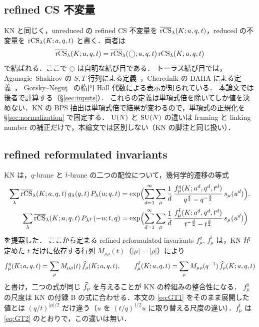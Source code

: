 \subsection{refined CS 不変量}
KN と同じく，unreduced の refined CS 不変量を $\overline{\textrm{rCS}}_\lambda(K;a,q,t)$，reduced の不変量を $\textrm{rCS}_\lambda(K;a,q,t)$ と書く．両者は
\[
\overline{\textrm{rCS}}_\lambda(K;a,q,t)=\overline{\textrm{rCS}}_\lambda(\bigcirc;a,q,t)\,\textrm{rCS}_\lambda(K;a,q,t)
\]
で結ばれる．ここで $\bigcirc$ は自明な結び目である．
トーラス結び目では，Aganagic--Shakirov の $S,T$ 行列による定義~\cite{Aganagic11}，Cherednik の DAHA による定義~\cite{Cherednik11}，
Gorsky--Neguţ~\cite{Gorsky13b} の楕円 Hall 代数による表示が知られている．
本論文では後者で計算する（\S\ref{sec:inputs}）．
これらの定義は単項式倍を除いてしか値を決めない．KN の BPS 抽出は単項式倍で結果が変わるので，単項式の正規化を \S\ref{sec:normalization} で固定する．
$\mathrm{U}(N)$ と $\mathrm{SU}(N)$ の違いは framing と linking number の補正だけで，本論文では区別しない（KN の脚注と同じ扱い）．

\subsection{refined reformulated invariants}
KN は，$q$-brane と $\bar t$-brane の二つの配位について，幾何学的遷移の等式
\begin{align}
\sum_\lambda \overline{\textrm{rCS}}_\lambda(K;a,q,t)\,g_\lambda(q,t)\,P_\lambda(u;q,t)
&=\exp\Bigl(\sum_{d=1}^\infty\sum_\mu \frac1d\,\frac{f^q_\mu(K;a^d,q^d,t^d)}{q^{\frac d2}-q^{-\frac d2}}\,s_\mu(u^d)\Bigr),\label{eq:GT1}\\
\sum_\lambda \overline{\textrm{rCS}}_\lambda(K;a,q,t)\,P_{\lambda^T}(-u;t,q)
&=\exp\Bigl(\sum_{d=1}^\infty\sum_\mu \frac1d\,\frac{f^{\bar t}_\mu(K;a^d,q^d,t^d)}{t^{-\frac d2}-t^{\frac d2}}\,s_\mu(u^d)\Bigr)\label{eq:GT2}
\end{align}
を提案した．
ここから定まる refined reformulated invariants $f^q_\mu$, $f^{\bar t}_\mu$ は，KN が定めた $t$ だけに依存する行列 $M_{\mu\rho}(t)$（$|\mu|=|\rho|$）により
\begin{equation}\label{eq:f-to-hatf}
f^q_\mu(K;a,q,t)=\sum_\rho M_{\mu\rho}(t)\,\widehat f_\rho(K;a,q,t),\qquad f^{\bar t}_\mu(K;a,q,t)=\sum_\rho M_{\mu\rho}(q^{-1})\,\widehat f_\rho(K;a,q,t)
\end{equation}
と書け，二つの式が同じ $\widehat f_\rho$ を与えることが KN の枠組みの整合性になる．
$f^q_\mu$ の尺度は KN の付録 B の式に合わせる．本文の \eqref{eq:GT1} をそのまま展開した値とは $(q/t)^{|\mu|/2}$ だけ違う（$u$ を $(t/q)^{1/2}u$ に取り替える尺度の違い）．$f^{\bar t}_\mu$ は \eqref{eq:GT2} のとおりで，この違いは無い．


